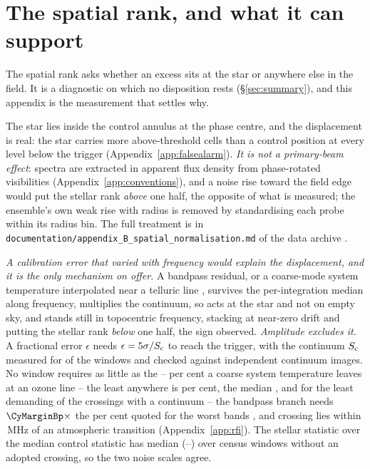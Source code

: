 \section{The spatial rank, and what it can support}
\label{app:radius}

The spatial rank asks whether an excess sits at the star or anywhere else in
the field. It is a diagnostic on which no disposition rests
(\S\ref{sec:summary}), and this appendix is the measurement that settles why.

The star lies inside the control annulus at the phase centre, and the
displacement is real: the star carries more above-threshold cells than a
control position at every level below the trigger
(Appendix~\ref{app:falsealarm}). \emph{It is not a primary-beam effect}:
spectra are extracted in apparent flux density from phase-rotated visibilities
(Appendix~\ref{app:conventions}), and a noise rise toward the field edge would
put the stellar rank \emph{above} one half, the opposite of what is measured;
the ensemble's own weak rise with radius is removed by standardising each
probe within its radius bin. The full treatment is in
\texttt{documentation/\allowbreak appendix\_B\_spatial\_normalisation.md} of the data
archive \citep{SIdeposit}.

\emph{A calibration error that varied with frequency would explain the
displacement, and it is the only mechanism on offer.} A bandpass residual, or
a coarse-mode system temperature interpolated near a telluric line
\citep{ALMATsys2018}, survives the per-integration median along frequency,
multiplies the continuum, so acts at the star and not on empty sky, and stands
still in topocentric frequency, stacking at near-zero drift and putting the
stellar rank \emph{below} one half, the sign observed. \emph{Amplitude excludes
it.} A fractional error $\epsilon$ needs $\epsilon=5\sigma/S_{\rm c}$ to reach
the trigger, with the continuum $S_{\rm c}$ measured for \CyNWinMeas{} of the
\CyNWinTot{} windows and checked against independent continuum images. No
window requires as little as the \CySpecTsysLo--\CySpecTsysHi{} per cent a
coarse system temperature leaves at an ozone line -- the least anywhere is
\CyEpsMinPct{} per cent, the median \CyEpsMedPct, and \CyCrossEpsLoPct{} for
the least demanding of the \CyNCrossMeas{} crossings with a continuum -- the
bandpass branch needs $\CyMarginBp\times$ the \CdSpecBpWorst{} per cent quoted
for the worst bands \citep{ALMAKBBandpass,ALMATechNote15}, and \ScNInRad{}
crossing lies within \ScRadMHz\,MHz of an atmospheric transition
(Appendix~\ref{app:rfi}). The stellar statistic over the median control
statistic has median \NsrMed{} (\NsrLo--\NsrHi) over \NsrNWin{} census windows
without an adopted crossing, so the two noise scales agree.

